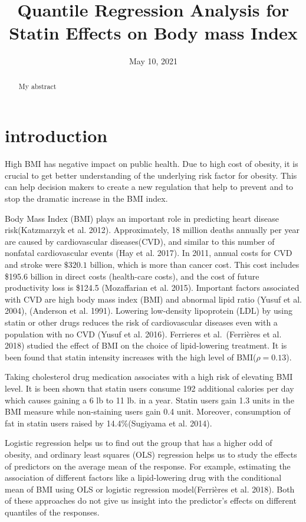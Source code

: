 \documentclass[
  12pt,
]{article}
\title{Quantile Regression Analysis for Statin Effects on Body mass Index}
\author{}
\date{\vspace{-2.5em}May 10, 2021}
\begin{document}
\maketitle
\begin{abstract}
My abstract
\end{abstract}

{
\setcounter{tocdepth}{2}
\tableofcontents
}
\section{introduction}

High BMI has negative impact on public health. Due to high cost of obesity, it is crucial to get better understanding of the underlying risk factor for obesity. This can help decision makers to create a new regulation that help to prevent and to stop the dramatic increase in the BMI index.

Body Mass Index (BMI) plays an important role in predicting heart disease risk(Katzmarzyk et al. 2012). Approximately, 18 million deaths annually per year are caused by cardiovascular diseases(CVD), and similar to this number of nonfatal cardiovascular events (Hay et al. 2017).
In 2011, annual costs for CVD and stroke were \(\$320.1\) billion, which is more than cancer cost. This cost includes \$195.6 billion in direct costs (health-care costs), and the cost of future productivity loss is \$124.5 (Mozaffarian et al. 2015). Important factors associated with CVD are high body mass index (BMI) and abnormal lipid ratio (Yusuf et al. 2004), (Anderson et al. 1991). Lowering low-density lipoprotein (LDL) by using statin or other drugs reduces the risk of cardiovascular diseases even with a population with no CVD (Yusuf et al. 2016). Ferrieres et al.~(Ferrières et al. 2018) studied the effect of BMI on the choice of lipid-lowering treatment. It is been found that statin intensity increases with the high level of BMI(\(\rho=0.13\)).

Taking cholesterol drug medication associates with a high risk of elevating BMI level. It is been shown that statin users consume 192 additional calories per day which causes gaining a 6 lb to 11 lb. in a year. Statin users gain 1.3 units in the BMI measure while non-staining users gain 0.4 unit. Moreover, consumption of fat in statin users raised by 14.4\%(Sugiyama et al. 2014).

Logistic regression helps us to find out the group that has a higher odd of obesity, and ordinary least squares (OLS) regression helps us to study the effects of predictors on the average mean of the response. For example, estimating the association of different factors like a lipid-lowering drug with the conditional mean of BMI using OLS or logistic regression model(Ferrières et al. 2018). Both of these approaches do not give us insight into the predictor's effects on different quantiles of the responses.
\end{document}
